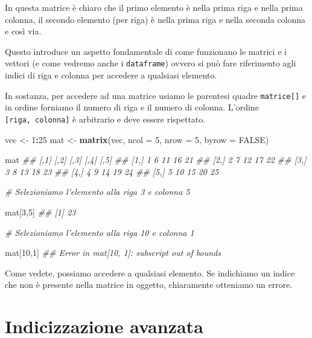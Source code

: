\documentclass[
]{book}
\newenvironment{Shaded}{\begin{snugshade}}{\end{snugshade}}
\newcommand{\CommentTok}[1]{\textcolor[rgb]{0.56,0.35,0.01}{\textit{#1}}}
\newcommand{\DataTypeTok}[1]{\textcolor[rgb]{0.13,0.29,0.53}{#1}}
\newcommand{\DecValTok}[1]{\textcolor[rgb]{0.00,0.00,0.81}{#1}}
\newcommand{\KeywordTok}[1]{\textcolor[rgb]{0.13,0.29,0.53}{\textbf{#1}}}
\newcommand{\NormalTok}[1]{#1}
\newcommand{\OperatorTok}[1]{\textcolor[rgb]{0.81,0.36,0.00}{\textbf{#1}}}
\newcommand{\OtherTok}[1]{\textcolor[rgb]{0.56,0.35,0.01}{#1}}
\newcommand{\StringTok}[1]{\textcolor[rgb]{0.31,0.60,0.02}{#1}}
\begin{document}
In questa matrice è chiaro che il primo elemento è nella prima riga e nella prima colonna, il secondo elemento (per riga) è nella prima riga e nella seconda colonna e così via.

Questo introduce un aspetto fondamentale di come funzionano le matrici e i vettori (e come vedremo anche i \texttt{dataframe}) ovvero si può fare riferimento agli indici di riga e colonna per accedere a qualsiasi elemento.

In sostanza, per accedere ad una matrice usiamo le parentesi quadre \texttt{matrice{[}{]}} e in ordine forniamo il numero di riga e il numero di colonna. L'ordine \texttt{{[}riga,\ colonna{]}} è arbitrario e deve essere rispettato.

\begin{Shaded}
\begin{Highlighting}[]
\NormalTok{vec <-}\StringTok{ }\DecValTok{1}\OperatorTok{:}\DecValTok{25}
\NormalTok{mat <-}\StringTok{ }\KeywordTok{matrix}\NormalTok{(vec, }\DataTypeTok{ncol =} \DecValTok{5}\NormalTok{, }\DataTypeTok{nrow =} \DecValTok{5}\NormalTok{, }\DataTypeTok{byrow =} \OtherTok{FALSE}\NormalTok{)}

\NormalTok{mat}
\CommentTok{##      [,1] [,2] [,3] [,4] [,5]}
\CommentTok{## [1,]    1    6   11   16   21}
\CommentTok{## [2,]    2    7   12   17   22}
\CommentTok{## [3,]    3    8   13   18   23}
\CommentTok{## [4,]    4    9   14   19   24}
\CommentTok{## [5,]    5   10   15   20   25}

\CommentTok{# Selezioniamo l'elemento alla riga 3 e colonna 5}

\NormalTok{mat[}\DecValTok{3}\NormalTok{,}\DecValTok{5}\NormalTok{]}
\CommentTok{## [1] 23}

\CommentTok{# Selezioniamo l'elemento alla riga 10 e colonna 1}

\NormalTok{mat[}\DecValTok{10}\NormalTok{,}\DecValTok{1}\NormalTok{]}
\CommentTok{## Error in mat[10, 1]: subscript out of bounds}
\end{Highlighting}
\end{Shaded}

Come vedete, possiamo accedere a qualsiasi elemento. Se indichiamo un indice che non è presente nella matrice in oggetto, chiaramente otteniamo un errore.

\hypertarget{indicizzazione-avanzata}{%
\section{Indicizzazione avanzata}\label{indicizzazione-avanzata}}
\end{document}
